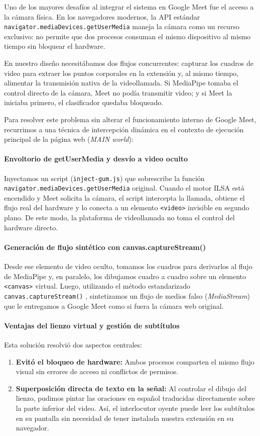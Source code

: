 Uno de los mayores desafíos al integrar el sistema en Google Meet fue el acceso a la cámara física. En los navegadores modernos, la API estándar \texttt{navigator.\-mediaDevices.\-getUserMedia} maneja la cámara como un recurso exclusivo: no permite que dos procesos consuman el mismo dispositivo al mismo tiempo sin bloquear el hardware.

En nuestro diseño necesitábamos dos flujos concurrentes: capturar los cuadros de video para extraer los puntos corporales en la extensión y, al mismo tiempo, alimentar la transmisión nativa de la videollamada. Si MediaPipe tomaba el control directo de la cámara, Meet no podía transmitir video; y si Meet la iniciaba primero, el clasificador quedaba bloqueado. 

Para resolver este problema sin alterar el funcionamiento interno de Google Meet, recurrimos a una técnica de intercepción dinámica en el contexto de ejecución principal de la página web (\textit{MAIN world}):

\paragraph{Envoltorio de getUserMedia y desvío a video oculto}
Inyectamos un script (\texttt{inject-gum.js}) que sobrescribe la función \texttt{navigator.mediaDevices.getUserMedia} original. Cuando el motor ILSA está encendido y Meet solicita la cámara, el script intercepta la llamada, obtiene el flujo real del hardware y lo conecta a un elemento \texttt{<video>} invisible en segundo plano. De este modo, la plataforma de videollamada no toma el control del hardware directo.

\paragraph{Generación de flujo sintético con canvas.captureStream()}
Desde ese elemento de video oculto, tomamos los cuadros para derivarlos al flujo de MediaPipe y, en paralelo, los dibujamos cuadro a cuadro sobre un elemento \texttt{<canvas>} virtual. Luego, utilizando el método estandarizado \texttt{canvas.captureStream()} \parencite{w3c2024mediacapture}, sintetizamos un flujo de medios falso (\textit{MediaStream}) que le entregamos a Google Meet como si fuera la cámara web original.

\paragraph{Ventajas del lienzo virtual y gestión de subtítulos}
Esta solución resolvió dos aspectos centrales:
\begin{enumerate}
    \item \textbf{Evitó el bloqueo de hardware:} Ambos procesos comparten el mismo flujo visual sin errores de acceso ni conflictos de permisos.
    \item \textbf{Superposición directa de texto en la señal:} Al controlar el dibujo del lienzo, pudimos pintar las oraciones en español traducidas directamente sobre la parte inferior del video. Así, el interlocutor oyente puede leer los subtítulos en su pantalla sin necesidad de tener instalada nuestra extensión en su navegador.
\end{enumerate}

